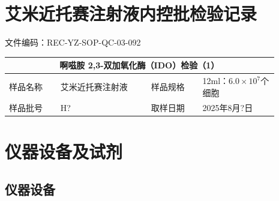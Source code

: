 \documentclass[UTF8,10pt,a4paper,fontset=fandol]{ctexart}
\newcommand{\fieldvalue}[1]{#1}
\newcommand{\handwritten}[1]{#1}
\begin{document}
\noindent

\newpage

\section*{艾米近托赛注射液内控批检验记录}

\noindent
文件编码：REC-YZ-SOP-QC-03-092

\begin{center}
\begin{tabular}{|p{0.17\linewidth}|p{0.30\linewidth}|p{0.17\linewidth}|p{0.25\linewidth}|}
\hline
\multicolumn{4}{|c|}{\textbf{啊嗞胺 2,3-双加氧化酶（IDO）检验（1）}}\\
\hline
样品名称 &
\fieldvalue{艾米近托赛注射液} &
样品规格 &
\fieldvalue{12ml：$6.0\times10^{7}$个细胞}\\
\hline
样品批号 &
\fieldvalue{\handwritten{H?}} &
取样日期 &
\fieldvalue{\handwritten{2025年8月?日}}\\
\hline
\end{tabular}
\end{center}

\section{仪器设备及试剂}

\subsection{仪器设备}
\end{document}
